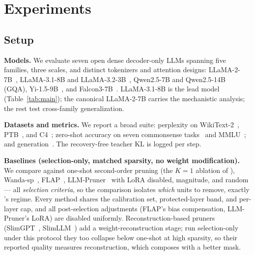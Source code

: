 \section{Experiments}
\label{sec:exp}

\subsection{Setup}
\textbf{Models.}
We evaluate seven open dense decoder-only LLMs spanning five families, three scales, and distinct tokenizers and attention designs: LLaMA-2-7B~\citep{touvron2023llama2}, LLaMA-3.1-8B and LLaMA-3.2-3B~\citep{dubey2024llama3}, Qwen2.5-7B and Qwen2.5-14B~\citep{qwen2025qwen25} (GQA), Yi-1.5-9B~\citep{ai2024yi}, and Falcon3-7B~\citep{falcon3}.
LLaMA-3.1-8B is the lead model (Table~\ref{tab:main}); the canonical LLaMA-2-7B carries the mechanistic analysis; the rest test cross-family generalization.

\textbf{Datasets and metrics.}
We report a broad suite: perplexity on WikiText-2~\citep{merity2017wikitext}, PTB~\citep{marcus1993ptb}, and C4~\citep{raffel2020t5}; zero-shot accuracy on seven commonsense tasks~\citep{clark2018arc,zellers2019hellaswag,sakaguchi2021winogrande,bisk2020piqa,mihaylov2018openbookqa,clark2019boolq} and MMLU~\citep{hendrycks2021mmlu}; and generation~\citep{cobbe2021gsm8k,chen2021humaneval,austin2021mbpp}. The recovery-free teacher KL is logged per step.

\textbf{Baselines (selection-only, matched sparsity, no weight modification).}
We compare against one-shot second-order pruning (the $K{=}1$ ablation of \method), Wanda-sp~\citep{sun2024wanda}, FLAP~\citep{an2024flap}, LLM-Pruner~\citep{ma2023llmpruner} with LoRA disabled, magnitude, and random --- all \emph{selection criteria}, so the comparison isolates \emph{which} units to remove, exactly \method's regime.
Every method shares the calibration set, protected-layer band, and per-layer cap, and all post-selection adjustments (FLAP's bias compensation, LLM-Pruner's LoRA) are disabled uniformly.
Reconstruction-based pruners (SlimGPT~\citep{ling2024slimgpt}, SlimLLM~\citep{guo2025slimllm}) add a weight-reconstruction stage; run selection-only under this protocol they too collapse below one-shot at high sparsity, so their reported quality measures reconstruction, which composes with a better mask.

